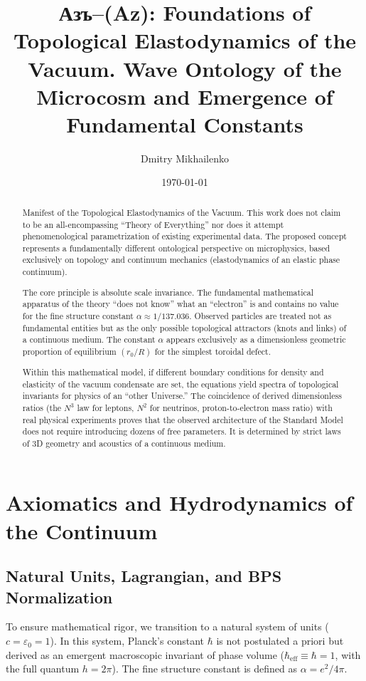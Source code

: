 \documentclass[12pt,a4paper]{article}
\title{Азъ--(Az): Foundations of Topological Elastodynamics of the Vacuum. Wave Ontology of the Microcosm and Emergence of Fundamental Constants}
\author{Dmitry Mikhailenko}
\date{\today}
\begin{document}
\maketitle

\begin{abstract}
Manifest of the Topological Elastodynamics of the Vacuum. This work does not claim to be an all-encompassing ``Theory of Everything'' nor does it attempt phenomeno\-logical parametrization of existing experimental data. The proposed concept represents a fundamentally different ontological perspective on microphysics, based exclusively on topology and continuum mechanics (elastodynamics of an elastic phase continuum).

The core principle is absolute scale invariance. The fundamental mathematical apparatus of the theory ``does not know'' what an ``electron'' is and contains no value for the fine structure constant $\alpha \approx 1/137.036$. Observed particles are treated not as fundamental entities but as the only possible topological attractors (knots and links) of a continuous medium. The constant $\alpha$ appears exclusively as a dimensionless geometric proportion of equilibrium $(r_0/R)$ for the simplest toroidal defect.

Within this mathematical model, if different boundary conditions for density and elasticity of the vacuum condensate are set, the equations yield spectra of topological invariants for physics of an ``other Universe.'' The coincidence of derived dimensionless ratios (the $N^3$ law for leptons, $N^2$ for neutrinos, proton-to-electron mass ratio) with real physical experiments proves that the observed architecture of the Standard Model does not require introducing dozens of free parameters. It is determined by strict laws of 3D geometry and acoustics of a continuous medium.
\end{abstract}

\section{Axiomatics and Hydrodynamics of the Continuum}

\subsection{Natural Units, Lagrangian, and BPS Normalization}
To ensure mathematical rigor, we transition to a natural system of units ($c=\varepsilon_0=1$). In this system, Planck's constant $\hbar$ is not postulated a priori but derived as an emergent macroscopic invariant of phase volume ($\hbar_{\text{eff}} \equiv \hbar = 1$, with the full quantum $h=2\pi$). The fine structure constant is defined as $\alpha = e^2/4\pi$.
\end{document}
